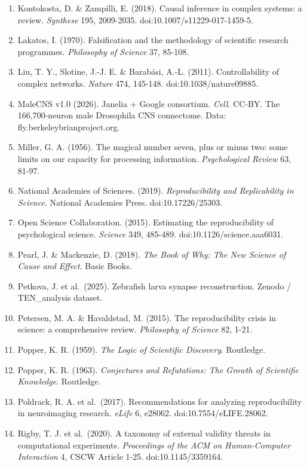 \documentclass[
]{article}
\begin{document}
\begin{enumerate}
\item
  Kontokosta, D. \& Zampilli, E. (2018). Causal inference in complex
  systems: a review. \emph{Synthese} 195, 2009-2035.
  doi:10.1007/s11229-017-1459-5.
\item
  Lakatos, I. (1970). Falsification and the methodology of scientific
  research programmes. \emph{Philosophy of Science} 37, 85-108.
\item
  Liu, T. Y., Slotine, J.-J. E. \& Barabási, A.-L. (2011).
  Controllability of complex networks. \emph{Nature} 474, 145-148.
  doi:10.1038/nature09885.
\item
  MaleCNS v1.0 (2026). Janelia + Google consortium. \emph{Cell}. CC-BY.
  The 166,700-neuron male Drosophila CNS connectome. Data:
  fly.berkeleybrianproject.org.
\item
  Miller, G. A. (1956). The magical number seven, plus or minus two:
  some limits on our capacity for processing information.
  \emph{Psychological Review} 63, 81-97.
\item
  National Academies of Sciences. (2019). \emph{Reproducibility and
  Replicability in Science}. National Academies Press.
  doi:10.17226/25303.
\item
  Open Science Collaboration. (2015). Estimating the reproducibility of
  psychological science. \emph{Science} 349, 485-489.
  doi:10.1126/science.aaa6031.
\item
  Pearl, J. \& Mackenzie, D. (2018). \emph{The Book of Why: The New
  Science of Cause and Effect}. Basic Books.
\item
  Petkova, J. et al.~(2025). Zebrafish larva synapse reconstruction.
  Zenodo / TEN\_analysis dataset.
\item
  Petersen, M. A. \& Havaldstad, M. (2015). The reproducibility crisis
  in science: a comprehensive review. \emph{Philosophy of Science} 82,
  1-21.
\item
  Popper, K. R. (1959). \emph{The Logic of Scientific Discovery}.
  Routledge.
\item
  Popper, K. R. (1963). \emph{Conjectures and Refutations: The Growth of
  Scientific Knowledge}. Routledge.
\item
  Poldrack, R. A. et al.~(2017). Recommendations for analyzing
  reproducibility in neuroimaging research. \emph{eLife} 6, e28062.
  doi:10.7554/eLIFE.28062.
\item
  Rigby, T. J. et al.~(2020). A taxonomy of external validity threats in
  computational experiments. \emph{Proceedings of the ACM on
  Human-Computer Interaction} 4, CSCW Article 1-25. doi:10.1145/3359164.

\end{enumerate}
\end{document}
